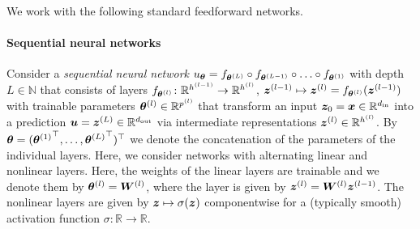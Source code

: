 We work with the following standard feedforward networks.

\paragraph{Sequential neural networks} Consider a \emph{sequential neural network} $%
u_{\vtheta} = f_{\vtheta^{(L)}} \circ f_{\vtheta^{(L-1)}} \circ \ldots \circ f_{\vtheta^{(1)}}
$ with depth $L\in\mathbb N$ that consists of layers %
$f_{{\bm{\theta}}^{(l)}}\colon {\mathbb{R}}^{h^{(l-1)}}\to{\mathbb{R}}^{h^{(l)}}$, ${\bm{z}}^{(l-1)}\mapsto {\bm{z}}^{(l)} = f_{{\bm{\theta}}^{(l)}}({\bm{z}}^{(l-1)})$
with trainable parameters $\vtheta^{(l)} \in \sR^{p^{(l)}}%
$ that transform an input ${\bm{z}}_0={\bm{x}} \in \mathbb R^{d_{\operatorname{in}}}$ into a prediction ${\bm{u}} = {\bm{z}}^{(L)}\in {\mathbb{R}}^{d_{\operatorname{out}}}$ via intermediate representations $\vz^{(l)} \in \sR^{h^{(l)}}%
$.
By ${\bm{\theta}} = ({{\bm{\theta}}^{(1)}}^{\top}, \dots, {{\bm{\theta}}^{(L)}}^{\top})^{\top}$ we denote the concatenation of the parameters of the individual layers.
Here, we consider networks with alternating  linear and nonlinear layers.
Here, the weights of the linear layers are trainable and we denote them by ${\bm{\theta}}^{(l)} = {\bm{W}}^{(l)}$, where the layer is given by ${\bm{z}}^{(l)} = {\bm{W}}^{(l)} {\bm{z}}^{(l-1)}$.
The nonlinear layers are given by ${\bm{z}}\mapsto \sigma({\bm{z}})$ componentwise for a (typically smooth) activation function $\sigma\colon\mathbb R\to\mathbb R$.

